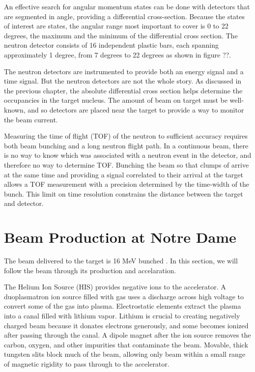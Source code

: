 An effective search for angular momentum states can be done with detectors that are segmented in angle, providing a differential cross-section.  Because the states of interest are \zp states, the angular range most important to cover is 0 to 22 degrees, the maximum and the minimum of the differential cross section.  The neutron detector consists of 16 independent plastic bars, each spanning approximately 1 degree, from 7 degrees to 22 degrees as shown in figure ??.

The neutron detectors are instrumented to provide both an energy signal and a time signal.  But the neutron detectors are not the whole story.  As discussed in the previous chapter, the absolute differential cross section helps determine the occupancies in the target nucleus.  The amount of beam on target must be well-known, and so detectors are placed near the target to provide a way to monitor the beam current.

Measuring the time of flight (TOF) of the neutron to sufficient accuracy requires both beam bunching and a long neutron flight path.  In a continuous beam, there is no way to know which  was associated with a neutron event in the detector, and therefore no way to determine TOF.  Bunching the beam so that clumps of  arrive at the same time and providing a signal correlated to their arrival at the target allows a TOF measurement with a precision determined by the time-width of the bunch.  This limit on time resolution constrains the distance between the target and detector.  

\section{Beam Production at Notre Dame}
The beam delivered to the target is 16 MeV bunched .  In this section, we will follow the beam through its production and accelaration.

The Helium Ion Source (HIS) provides negative  ions to the accelerator.  A duoplasmatron ion source filled with  gas uses a discharge across high voltage to convert some of the gas into plasma.  Electrostatic elements extract the plasma into a canal filled with lithium vapor.  Lithium is crucial to creating negatively charged beam because it donates electrons generously, and some  becomes ionized after passing through the canal.  A dipole magnet after the ion source removes the carbon, oxygen, and other impurities that contaminate the  beam.  Movable, thick tungsten slits block much of the beam, allowing only beam within a small range of magnetic rigidity to pass through to the accelerator.


